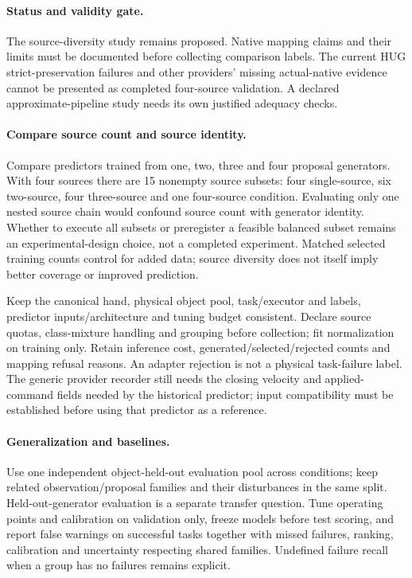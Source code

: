 \documentclass[10pt,letterpaper]{article}
\begin{document}
\paragraph{Status and validity gate.}
The source-diversity study remains proposed. Native mapping claims and their
limits must be documented before collecting comparison labels. The current
HUG strict-preservation failures and other providers' missing actual-native
evidence cannot be presented as completed four-source validation. A declared
approximate-pipeline study needs its own justified adequacy checks.

\paragraph{Compare source count and source identity.}
Compare predictors trained from one, two, three and four proposal generators.
With four sources there are 15 nonempty source subsets: four single-source,
six two-source, four three-source and one four-source condition. Evaluating
only one nested source chain would confound source count with generator identity.
Whether to execute all subsets or preregister a feasible balanced subset remains
an experimental-design choice, not a completed experiment. Matched selected
training counts control for added data; source diversity does not itself imply
better coverage or improved prediction.

Keep the canonical hand, physical object pool, task/executor and labels,
predictor inputs/architecture and tuning budget consistent. Declare source
quotas, class-mixture handling and grouping before collection; fit normalization
on training only. Retain inference cost, generated/selected/rejected counts and
mapping refusal reasons. An adapter rejection is not a physical task-failure
label. The generic provider recorder still needs the closing velocity and
applied-command fields needed by the historical predictor; input compatibility
must be established before using that predictor as a reference.

\paragraph{Generalization and baselines.}
Use one independent object-held-out evaluation pool across conditions; keep
related observation/proposal families and their disturbances in the same split.
Held-out-generator evaluation is a separate transfer question. Tune operating
points and calibration on validation only, freeze models before test scoring,
and report false warnings on successful tasks together with missed failures,
ranking, calibration and uncertainty respecting shared families. Undefined
failure recall when a group has no failures remains explicit.
\end{document}
